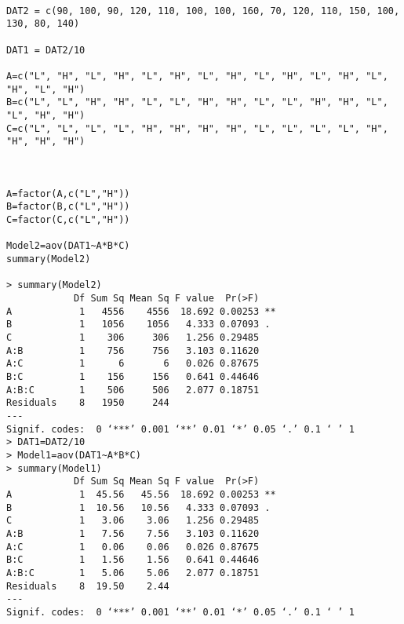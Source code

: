 \begin{verbatim}




DAT2 = c(90, 100, 90, 120, 110, 100, 100, 160, 70, 120, 110, 150, 100, 
130, 80, 140)

DAT1 = DAT2/10

A=c("L", "H", "L", "H", "L", "H", "L", "H", "L", "H", "L", "H", "L", "H", "L", "H")
B=c("L", "L", "H", "H", "L", "L", "H", "H", "L", "L", "H", "H", "L", "L", "H", "H")
C=c("L", "L", "L", "L", "H", "H", "H", "H", "L", "L", "L", "L", "H", "H", "H", "H")



A=factor(A,c("L","H"))
B=factor(B,c("L","H"))
C=factor(C,c("L","H"))

Model2=aov(DAT1~A*B*C)
summary(Model2)

> summary(Model2)
            Df Sum Sq Mean Sq F value  Pr(>F)   
A            1   4556    4556  18.692 0.00253 **
B            1   1056    1056   4.333 0.07093 . 
C            1    306     306   1.256 0.29485   
A:B          1    756     756   3.103 0.11620   
A:C          1      6       6   0.026 0.87675   
B:C          1    156     156   0.641 0.44646   
A:B:C        1    506     506   2.077 0.18751   
Residuals    8   1950     244                   
---
Signif. codes:  0 ‘***’ 0.001 ‘**’ 0.01 ‘*’ 0.05 ‘.’ 0.1 ‘ ’ 1 
> DAT1=DAT2/10
> Model1=aov(DAT1~A*B*C)
> summary(Model1)
            Df Sum Sq Mean Sq F value  Pr(>F)   
A            1  45.56   45.56  18.692 0.00253 **
B            1  10.56   10.56   4.333 0.07093 . 
C            1   3.06    3.06   1.256 0.29485   
A:B          1   7.56    7.56   3.103 0.11620   
A:C          1   0.06    0.06   0.026 0.87675   
B:C          1   1.56    1.56   0.641 0.44646   
A:B:C        1   5.06    5.06   2.077 0.18751   
Residuals    8  19.50    2.44                   
---
Signif. codes:  0 ‘***’ 0.001 ‘**’ 0.01 ‘*’ 0.05 ‘.’ 0.1 ‘ ’ 1 
\end{verbatim}



